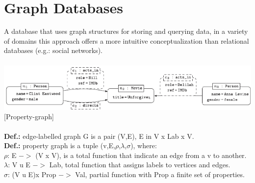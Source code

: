 \documentclass{article}
\begin{document}
\section{Graph Databases}
A database that uses graph structures for storing and querying data, in a variety of domains this approach offers a more intuitive conceptualization than relational databases (e.g.: social networks).\\\\
\includegraphics[scale=0.8]{22.png}[Property-graph]\\\\
\textbf{Def.:} edge-labelled graph G is a pair (V,E), E in V x Lab x V.\\
\textbf{Def.:} property graph is a tuple (v,E,$\rho$,$\lambda$,$\sigma$), where:\\
$\rho$: E $->$ (V x V), is a total function that indicate an edge from a v to another.\\
$\lambda$: V u E $->$ Lab, total function that assigns labels to vertices and edges.\\
$\sigma$: (V u E)x Prop $->$ Val, partial function with Prop a finite set of properties.\\
\end{document}
